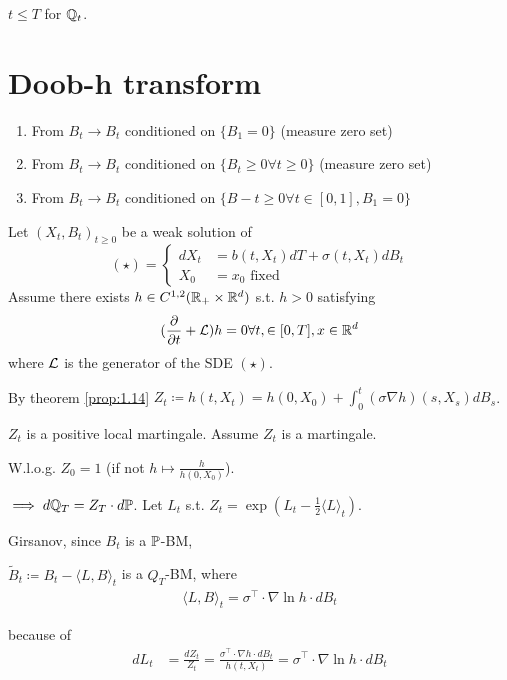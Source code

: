 $t\leq T$ for $\mathbb{Q}_t$. 

\section{Doob-h transform}
\begin{enumerate}
    \item From $B_t\to B_t$ conditioned on $\{B_1=0\}$ (measure zero set)
    \item From $B_t\to B_t$ conditioned on $\{B_t\geq 0\forall t\geq 0\}$ (measure zero set)
    \item From $B_t\to B_t$ conditioned on $\{B-t\geq 0\forall t\in [0,1],B_1=0\}$
\end{enumerate}

Let $(X_t,B_t)_{t\geq 0}$ be a weak solution of 
\[(\star)=\begin{cases}
    dX_t &= b(t,X_t)dT+\sigma(t,X_t)dB_t\\
    X_0&=x_0\text{ fixed}
\end{cases}\]
Assume there exists $h\in C^{1,2}(\mathbb{R}_+\times\mathbb{R}^d)$ s.t. $h>0$ satisfying 
\begin{equation*}
    (\frac{\partial}{\partial t}+\mathcal{L})h=0\forall t,\in [0,T],x\in\mathbb{R}^d
\end{equation*}
where $\mathcal{L}$ is the generator of the SDE $(\star)$.

By theorem \ref{prop:1.14} $Z_t\coloneqq h(t,X_t)=h(0,X_0)+\int_0^t (\sigma \nabla h)(s,X_s)dB_s$.

$Z_t$ is a positive local martingale. Assume $Z_t$ is a martingale.

W.l.o.g. $Z_0=1$ (if not $h\mapsto \frac{h}{h(0,X_0)}$).

$\implies d\mathbb{Q}_T =Z_T\cdot d\mathbb{P}$. Let $L_t$ s.t. $Z_t=\exp(L_t-\frac{1}{2}\langle L\rangle_t)$.

Girsanov, since $B_t$ is a $\mathbb{P}$-BM, 

$\tilde{B}_t\coloneqq B_t-\langle L,B\rangle_t$ is a $Q_T$-BM, where 
\begin{align*}
    \langle L, B\rangle_t =\sigma^\intercal\cdot \nabla\ln h \cdot d B_t
\end{align*}

because of 
\begin{align*}
    dL_t&=\frac{dZ_t}{Z_t}=\frac{\sigma^\intercal\cdot  \nabla h \cdot d B_t}{h(t,X_t)}=\sigma^\intercal\cdot \nabla\ln h \cdot d B_t\\
\end{align*}

